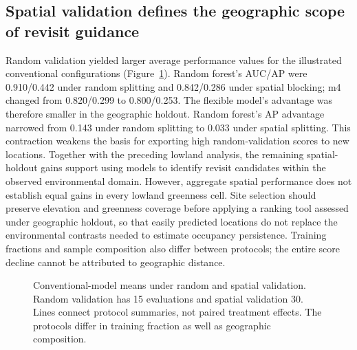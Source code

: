 

\subsection{Spatial validation defines the geographic scope of revisit guidance}
Random validation yielded larger average performance values for the illustrated conventional configurations (Figure~\ref{fig:protocolvalid}). Random forest's AUC/AP were 0.910/0.442 under random splitting and 0.842/0.286 under spatial blocking; m4 changed from 0.820/0.299 to 0.800/0.253. The flexible model's advantage was therefore smaller in the geographic holdout. Random forest's AP advantage narrowed from 0.143 under random splitting to 0.033 under spatial splitting. This contraction weakens the basis for exporting high random-validation scores to new locations. Together with the preceding lowland analysis, the remaining spatial-holdout gains support using models to identify revisit candidates within the observed environmental domain. However, aggregate spatial performance does not establish equal gains in every lowland greenness cell. Site selection should preserve elevation and greenness coverage before applying a ranking tool assessed under geographic holdout, so that easily predicted locations do not replace the environmental contrasts needed to estimate occupancy persistence. Training fractions and sample composition also differ between protocols; the entire score decline cannot be attributed to geographic distance.
\begin{figure}[htbp]\centering
{}
\caption{Conventional-model means under random and spatial validation. Random validation has 15 evaluations and spatial validation 30. Lines connect protocol summaries, not paired treatment effects. The protocols differ in training fraction as well as geographic composition.}\label{fig:protocolvalid}
\end{figure}

\FloatBarrier



